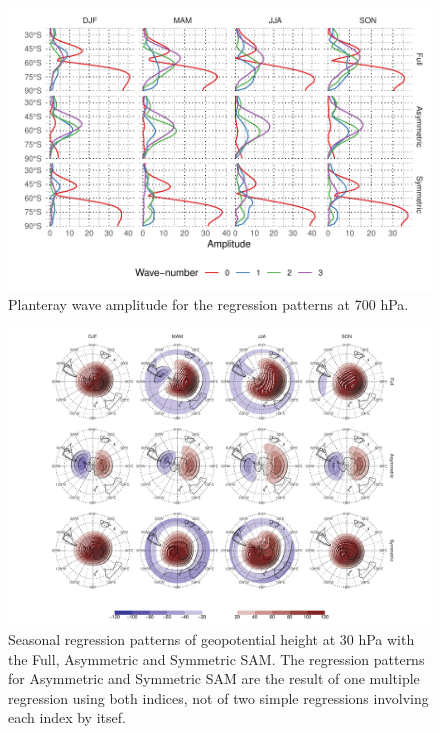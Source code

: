 \documentclass[]{ametsocV5}
\begin{document}
\begin{figure}
\includegraphics{wave-amplitude-700-1} \caption[Planteray wave amplitude for the regression patterns at 700 hPa]{Planteray wave amplitude for the regression patterns at 700 hPa.}\label{fig:wave-amplitude-700}
\end{figure}

\begin{figure}
\includegraphics{2d-regr-30-1} \caption[Seasonal regression patterns of geopotential height at 30 hPa with the Full, Asymmetric and Symmetric SAM]{Seasonal regression patterns of geopotential height at 30 hPa with the Full, Asymmetric and Symmetric SAM. The regression patterns for Asymmetric and Symmetric SAM are the result of one multiple regression using both indices, not of two simple regressions involving each index by itsef.}\label{fig:2d-regr-30}
\end{figure}
\end{document}
